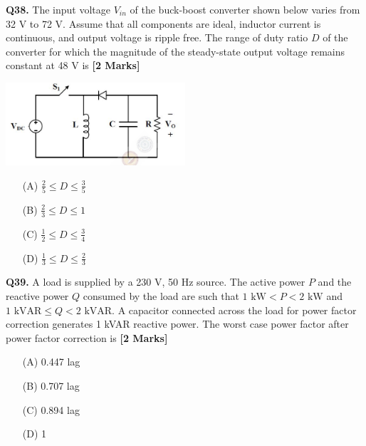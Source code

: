 \documentclass[11pt]{article}
\newcommand{\questionb}[2]{
    \noindent\textbf{Q#2.} #1 \hfill \textbf{[2 Marks]}
}
\begin{document}
\questionb{The input voltage \( V_{in} \) of the buck-boost converter shown below varies from 32 V to 72 V. Assume that all components are ideal, inductor current is continuous, and output voltage is ripple free. The range of duty ratio \( D \) of the converter for which the magnitude of the steady-state output voltage remains constant at 48 V is}{38}
\begin{center}
\includegraphics[width=0.5\textwidth]{figures/38.png}
\end{center}
\begin{enumerate}
    \item[(A)] \( \frac{2}{5} \leq D \leq \frac{3}{5} \)  
    \item[(B)] \( \frac{2}{3} \leq D \leq 1 \)  
    \item[(C)] \( \frac{1}{2} \leq D \leq \frac{3}{4} \)  
    \item[(D)] \( \frac{1}{3} \leq D \leq \frac{2}{3} \)  
\end{enumerate}
\vspace{0.5cm}

\questionb{A load is supplied by a 230 V, 50 Hz source. The active power \( P \) and the reactive power \( Q \) consumed by the load are such that \( 1 \text{ kW} < P < 2 \text{ kW} \) and \( 1 \text{ kVAR} \leq Q < 2 \text{ kVAR} \). A capacitor connected across the load for power factor correction generates 1 kVAR reactive power. The worst case power factor after power factor correction is}{39}
\begin{enumerate}
    \item[(A)] 0.447 lag  
    \item[(B)] 0.707 lag  
    \item[(C)] 0.894 lag  
    \item[(D)] 1  
\end{enumerate}
\vspace{0.5cm}
\end{document}
